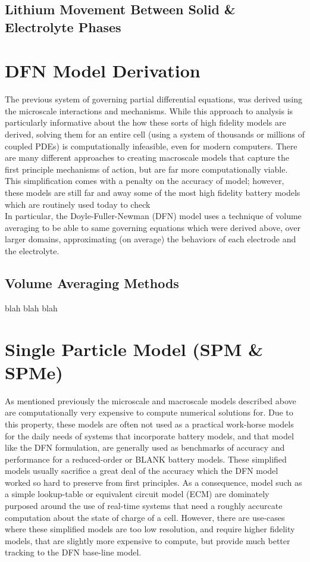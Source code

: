 \documentclass[lettersize,journal]{IEEEtran}
\begin{document}
\subsection{Lithium Movement Between Solid \& Electrolyte Phases}


\section{DFN Model Derivation}

The previous system of governing partial differential equations, was derived using the microscale interactions and mechanisms. While this approach to analysis is particularly informative about the how these sorts of high fidelity models are derived, solving them for an entire cell (using a system of thousands or millions of coupled PDEs) is computationally infeasible, even for modern computers. There are many different approaches to creating macroscale models that capture the first principle mechanisms of action, but are far more computationally viable. This simplification comes with a penalty on the accuracy of model; however, these models are still far and away some of the most high fidelity battery models which are routinely used today to check  \\

In particular, the Doyle-Fuller-Newman (DFN) model uses a technique of volume averaging to be able to same governing equations which were derived above, over larger domains, approximating (on average) the behaviors of each electrode and the electrolyte. \\

\subsection{Volume Averaging Methods}

blah blah blah

\section{Single Particle Model (SPM \& SPMe)}

As mentioned previously the microscale and macroscale models described above are computationally very expensive to compute numerical solutions for. Due to this property, these models are often not used as a practical work-horse models for the daily needs of systems that incorporate battery models, and that model like the DFN formulation, are generally used as benchmarks of accuracy and performance for a reduced-order or BLANK battery models. These simplified models usually sacrifice a great deal of the accuracy which the DFN model worked so hard to preserve from first principles. As a consequence, model such as a simple lookup-table or equivalent circuit model (ECM) are dominately purposed around the use of real-time systems that need a roughly accurcate computation about the state of charge of a cell. However, there are use-cases where these simplified models are too low resolution, and require higher fidelity models, that are slightly more expensive to compute, but provide much better tracking to the DFN base-line model. \\
\end{document}
